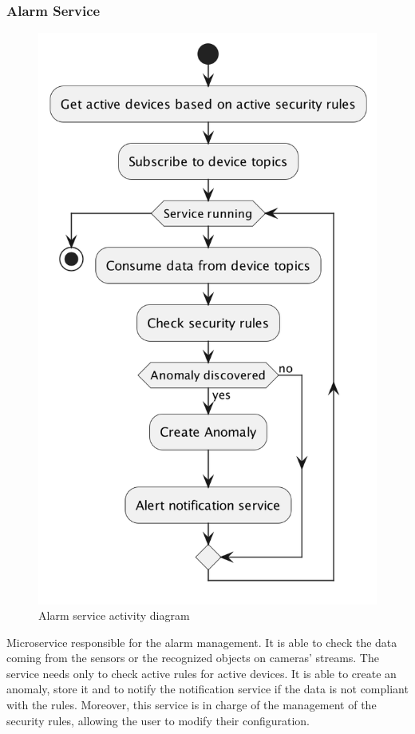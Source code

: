 \documentclass{scrartcl}
\begin{document}
    \subsubsection{Alarm Service}
    \begin{figure}
        \centering
        \includegraphics[scale=0.3]{img/alarm-activity}
        \caption{Alarm service activity diagram}
        \label{fig:alarm-activity}
    \end{figure}
    Microservice responsible for the alarm management.
    It is able to check the data coming from the sensors or the recognized objects on cameras' streams.
    The service needs only to check active rules for active devices.
    It is able to create an anomaly, store it and to notify the notification service if the data is not compliant with the rules.
    Moreover, this service is in charge of the management of the security rules, allowing the user to modify their configuration.
\end{document}

